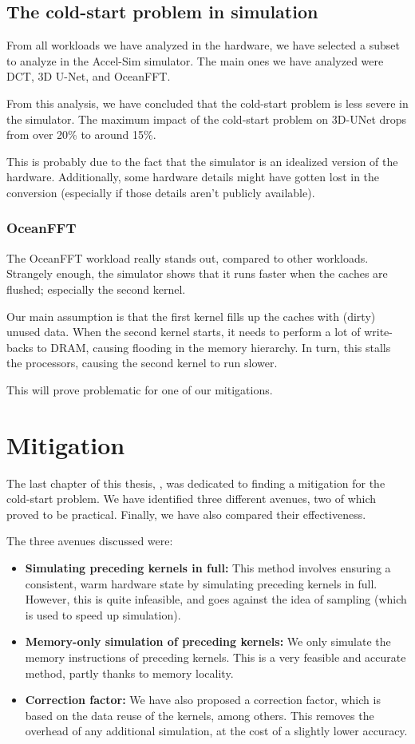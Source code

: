\subsection{The cold-start problem in simulation}\label{subsec:cold-start-in-simulation}
From all workloads we have analyzed in the hardware, we have selected a subset to analyze in the Accel-Sim simulator.
The main ones we have analyzed were DCT, 3D U-Net, and OceanFFT\@.

From this analysis, we have concluded that the cold-start problem is less severe in the simulator.
The maximum impact of the cold-start problem on 3D-UNet drops from over 20\% to around 15\%.

This is probably due to the fact that the simulator is an idealized version of the hardware.
Additionally, some hardware details might have gotten lost in the conversion (especially if those details aren't publicly available).

\subsubsection{OceanFFT}\label{subsubsec:oceanfft}
The OceanFFT workload really stands out, compared to other workloads.
Strangely enough, the simulator shows that it runs faster when the caches are flushed; especially the second kernel.

Our main assumption is that the first kernel fills up the caches with (dirty) unused data.
When the second kernel starts, it needs to perform a lot of write-backs to DRAM, causing flooding in the memory hierarchy.
In turn, this stalls the processors, causing the second kernel to run slower.

This will prove problematic for one of our mitigations.

\section{Mitigation}\label{sec:mitigation}
The last chapter of this thesis, , was dedicated to finding a mitigation for the cold-start problem.
We have identified three different avenues, two of which proved to be practical.
Finally, we have also compared their effectiveness.

The three avenues discussed were:
\begin{itemize}
    \item \textbf{Simulating preceding kernels in full:} This method involves ensuring a consistent, warm hardware state by simulating preceding kernels in full.
    However, this is quite infeasible, and goes against the idea of sampling (which is used to speed up simulation).
    \item \textbf{Memory-only simulation of preceding kernels:} We only simulate the memory instructions of preceding kernels.
    This is a very feasible and accurate method, partly thanks to memory locality.
    \item \textbf{Correction factor:} We have also proposed a correction factor, which is based on the data reuse of the kernels, among others.
    This removes the overhead of any additional simulation, at the cost of a slightly lower accuracy.
\end{itemize}

